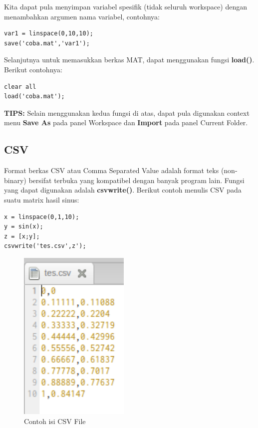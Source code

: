 \documentclass[12pt]{book}
\begin{document}
	Kita dapat pula menyimpan variabel spesifik (tidak seluruh workspace) dengan menambahkan argumen nama variabel,
	contohnya:
	
	\begin{verbatim}
var1 = linspace(0,10,10);
save('coba.mat','var1');
	\end{verbatim}

	Selanjutnya untuk memasukkan berkas MAT, dapat menggunakan fungsi \textbf{load()}.
	Berikut contohnya:
	\begin{verbatim}
clear all
load('coba.mat');
	\end{verbatim}

	\textbf{TIPS:} Selain menggunakan kedua fungsi di atas, dapat pula digunakan context menu \textbf{Save As} pada panel Workspace
	dan \textbf{Import} pada panel Current Folder.
	
	\subsection{CSV}
	
	Format berkas CSV atau Comma Separated Value adalah format teks (non-binary) bersifat terbuka yang kompatibel dengan banyak program lain.
	Fungsi yang dapat digunakan adalah \textbf{csvwrite()}.
	Berikut contoh menulis CSV pada suatu matrix hasil sinus:
	\begin{verbatim}
x = linspace(0,1,10);
y = sin(x);
z = [x;y];
csvwrite('tes.csv',z');
	\end{verbatim}

	\begin{figure}[!ht]
		\centering
		\includegraphics[width=150pt]{images/csvfile}
		\caption{Contoh isi CSV File}
	\end{figure}
\end{document}

